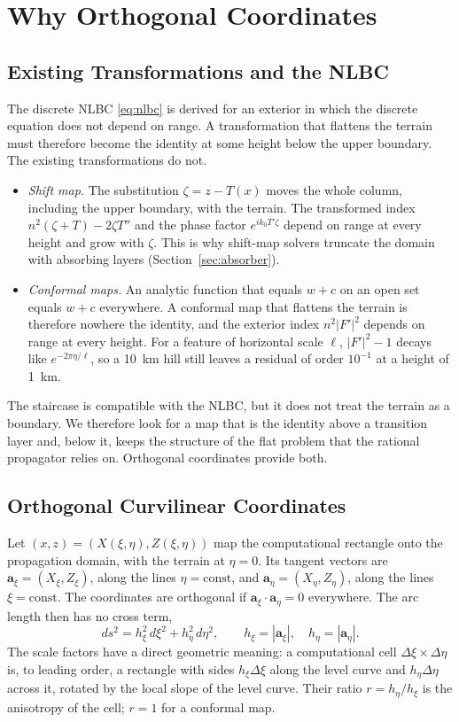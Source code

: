 \documentclass[journal]{IEEEtran}
\begin{document}
\section{Why Orthogonal Coordinates}\label{sec:why}

\subsection{Existing Transformations and the NLBC}
The discrete NLBC \eqref{eq:nlbc} is derived for an exterior in which the
discrete equation does not depend on range. A transformation that flattens the
terrain must therefore become the identity at some height below the upper
boundary. The existing transformations do not.
\begin{itemize}
\item \emph{Shift map.} The substitution $\zeta=z-T(x)$ moves the whole column,
including the upper boundary, with the terrain. The transformed index
$n^2(\zeta+T)-2\zeta T''$ and the phase factor $e^{ik_0T'\zeta}$ depend on range
at every height and grow with $\zeta$. This is why shift-map solvers truncate
the domain with absorbing layers (Section~\ref{sec:absorber}).
\item \emph{Conformal maps.} An analytic function that equals $w+c$ on an open
set equals $w+c$ everywhere. A conformal map that flattens the terrain is
therefore nowhere the identity, and the exterior index $n^2|F'|^2$ depends on
range at every height. For a feature of horizontal scale $\ell$,
$|F'|^2-1$ decays like $e^{-2\pi\eta/\ell}$, so a \SI{10}{km} hill still leaves a
residual of order $10^{-1}$ at a height of \SI{1}{km}.
\end{itemize}
The staircase is compatible with the NLBC, but it does not treat the terrain as
a boundary. We therefore look for a map that is the identity above a transition
layer and, below it, keeps the structure of the flat problem that the rational
propagator relies on. Orthogonal coordinates provide both.

\subsection{Orthogonal Curvilinear Coordinates}
Let $(x,z)=(X(\xi,\eta),Z(\xi,\eta))$ map the computational rectangle onto the
propagation domain, with the terrain at $\eta=0$. Its tangent vectors are
$\mathbf a_\xi=(X_\xi,Z_\xi)$, along the lines $\eta=\text{const}$, and
$\mathbf a_\eta=(X_\eta,Z_\eta)$, along the lines $\xi=\text{const}$. The
coordinates are orthogonal if $\mathbf a_\xi\cdot\mathbf a_\eta=0$ everywhere.
The arc length then has no cross term,
\begin{equation}\label{eq:arc}
ds^2=h_\xi^2\,d\xi^2+h_\eta^2\,d\eta^2,\qquad h_\xi=|\mathbf a_\xi|,\quad h_\eta=|\mathbf a_\eta| .
\end{equation}
The scale factors have a direct geometric meaning: a computational cell
$\Delta\xi\times\Delta\eta$ is, to leading order, a rectangle with sides
$h_\xi\Delta\xi$ along the level curve and $h_\eta\Delta\eta$ across it, rotated by
the local slope of the level curve. Their ratio $r=h_\eta/h_\xi$ is the
anisotropy of the cell; $r=1$ for a conformal map.
\end{document}
